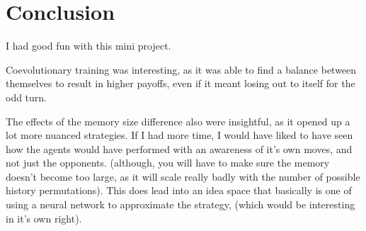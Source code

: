 \documentclass[11pt]{scrartcl} %
\begin{document}
\section{Conclusion}


I had good fun with this mini project.

Coevolutionary training was interesting, as it was able to find a balance between themselves to result in higher payoffs, even if it meant losing out to itself for the odd turn.

The effects of the memory size difference also were insightful, as it opened up a lot more nuanced strategies.
If I had more time, I would have liked to have seen how the agents would have performed with an awareness of it's own moves, and not just the opponents.
(although, you will have to make sure the memory doesn't become too large, as it will scale really badly with the number of possible history permutations). This does lead into an idea space that basically is one of using a neural network to approximate the strategy, (which would be interesting in it's own right).





\end{document}
